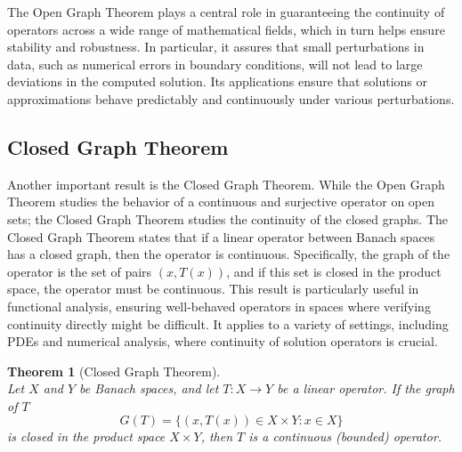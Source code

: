 \documentclass[12pt, reqno]{amsart}
\newtheorem{theorem}{Theorem}[section]
\theoremstyle{definition}
\numberwithin{equation}{section}
\begin{document}
The Open Graph Theorem plays a central role in guaranteeing the continuity of operators across a wide range of mathematical fields, which in turn helps ensure stability and robustness. In particular, it assures that small perturbations in data, such as numerical errors in boundary conditions, will not lead to large deviations in the computed solution. Its applications ensure that solutions or approximations behave predictably and continuously under various perturbations.

\subsection{Closed Graph Theorem}
Another important result is the Closed Graph Theorem. While the Open Graph Theorem studies the behavior of a continuous and surjective operator on open sets; the Closed Graph Theorem studies the continuity of the closed graphs.
The Closed Graph Theorem states that if a linear operator between Banach spaces has a closed graph, then the operator is continuous. Specifically, the graph of the operator is the set of pairs $(x, T(x))$, and if this set is closed in the product space, the operator must be continuous. This result is particularly useful in functional analysis, ensuring well-behaved operators in spaces where verifying continuity directly might be difficult. It applies to a variety of settings, including PDEs and numerical analysis, where continuity of solution operators is crucial.

\begin{theorem}[Closed Graph Theorem] \hfill \\
Let $X$ and $Y$ be Banach spaces, and let $T: X \to Y$ be a linear operator. If the graph of $T$
\[
G(T) = \{(x, T(x)) \in X \times Y : x \in X\} 
\]
is closed in the product space $X \times Y$, then $T$ is a continuous (bounded) operator.
\end{theorem}
\end{document}
